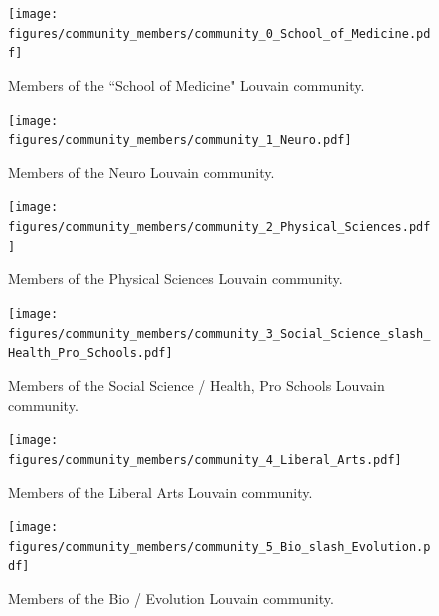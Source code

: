 \documentclass[notitlepage,aps,prd,nofootinbib]{revtex4-1}
\newcommand{\figures}{../outputs/plots}
\begin{document}
\begin{appendices}
\begin{figure}[!htb]\centering
  \texttt{[image: \\figures/community\_members/community\_0\_School\_of\_Medicine.pdf]}
  \caption{Members of the ``School of Medicine" Louvain community.}
\end{figure}

\begin{figure}[!htb]\centering
  \texttt{[image: \\figures/community\_members/community\_1\_Neuro.pdf]}
  \caption{Members of the Neuro Louvain community.}
\end{figure}

\begin{figure}[!htb]\centering
  \texttt{[image: \\figures/community\_members/community\_2\_Physical\_Sciences.pdf]}
  \caption{Members of the Physical Sciences Louvain community.}
  \label{fig:f_community_physical_sciences}
\end{figure}

\begin{figure}[!htb]\centering
  \texttt{[image: \\figures/community\_members/community\_3\_Social\_Science\_slash\_Health\_Pro\_Schools.pdf]}
  \caption{Members of the Social Science / Health, Pro Schools Louvain community.}
\end{figure}

\begin{figure}[!htb]\centering
  \texttt{[image: \\figures/community\_members/community\_4\_Liberal\_Arts.pdf]}
  \caption{Members of the Liberal Arts Louvain community.}
\end{figure}

\begin{figure}[!htb]\centering
  \texttt{[image: \\figures/community\_members/community\_5\_Bio\_slash\_Evolution.pdf]}
  \caption{Members of the Bio / Evolution Louvain community.}
\end{figure}



\end{appendices}
\end{document}
